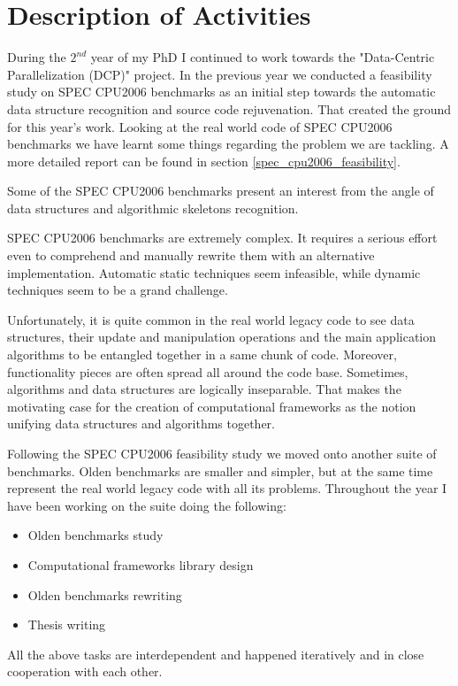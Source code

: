 \documentclass[10pt,a4paper]{report}
\begin{document}
\section{Description of Activities}
\label{active_description}
\quad During the $2^{nd}$ year of my PhD I continued to work towards the "Data-Centric Parallelization (DCP)" project. In the previous year we conducted a feasibility study on SPEC CPU2006 benchmarks as an initial step towards the automatic data structure recognition and source code rejuvenation. That created the ground for this year's work. Looking at the real world code of SPEC CPU2006 benchmarks we have learnt some things regarding the problem we are tackling. A more detailed report can be found in section \ref{spec_cpu2006_feasibility}.
\begin{description}[style=nextline]
\item [Research interest] Some of the SPEC CPU2006 benchmarks present an interest from the angle of data structures and algorithmic skeletons recognition.\hfill
\item [Real world legacy code complexity] SPEC CPU2006 benchmarks are extremely complex. It requires a serious effort even to comprehend and manually rewrite them with an alternative implementation. Automatic static techniques seem infeasible, while dynamic techniques seem to be a grand challenge.\hfill
\item [Close relationship between algorithms and data structures] Unfortunately, it is quite common in the real world legacy code to see data structures, their update and manipulation operations and the main application algorithms to be entangled together in a same chunk of code. Moreover, functionality pieces are often spread all around the code base. Sometimes, algorithms and data structures are logically inseparable. That makes the motivating case for the creation of computational frameworks as the notion unifying data structures and algorithms together.\hfill
\end{description}
\quad Following the SPEC CPU2006 feasibility study we moved onto another suite of benchmarks. Olden benchmarks are smaller and simpler, but at the same time represent the real world legacy code with all its problems. Throughout the year I have been working on the suite doing the following: 
\begin{itemize}
\renewcommand\labelitemi{$\bullet$}
\item Olden benchmarks study
\item Computational frameworks library design
\item Olden benchmarks rewriting
\item Thesis writing
\end{itemize}
\quad All the above tasks are interdependent and happened iteratively and in close cooperation with each other.
\end{document}
